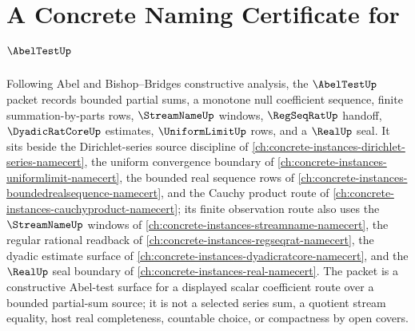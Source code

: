 \chapter{A Concrete Naming Certificate for $\AbelTestUp$}
\label{ch:concrete-instances-abel-test-namecert}

Following Abel and Bishop--Bridges constructive analysis, the $\AbelTestUp$ packet records bounded partial sums, a monotone null coefficient sequence, finite summation-by-parts rows, $\StreamNameUp$ windows, $\RegSeqRatUp$ handoff, $\DyadicRatCoreUp$ estimates, $\UniformLimitUp$ rows, and a $\RealUp$ seal. It sits beside the Dirichlet-series source discipline of \autoref{ch:concrete-instances-dirichlet-series-namecert}, the uniform convergence boundary of \autoref{ch:concrete-instances-uniformlimit-namecert}, the bounded real sequence rows of \autoref{ch:concrete-instances-boundedrealsequence-namecert}, and the Cauchy product route of \autoref{ch:concrete-instances-cauchyproduct-namecert}; its finite observation route also uses the $\StreamNameUp$ windows of \autoref{ch:concrete-instances-streamname-namecert}, the regular rational readback of \autoref{ch:concrete-instances-regseqrat-namecert}, the dyadic estimate surface of \autoref{ch:concrete-instances-dyadicratcore-namecert}, and the $\RealUp$ seal boundary of \autoref{ch:concrete-instances-real-namecert}. The packet is a constructive Abel-test surface for a displayed scalar coefficient route over a bounded partial-sum source; it is not a selected series sum, a quotient stream equality, host real completeness, countable choice, or compactness by open covers.

